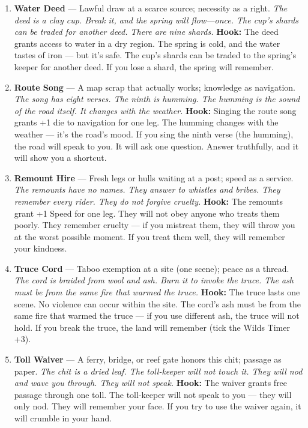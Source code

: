 \begin{enumerate}
\item \textbf{Water Deed} --- Lawful draw at a scarce source; necessity as a right.
  \hfill \textit{The deed is a clay cup. Break it, and the spring will flow---once. The cup's shards can be traded for another deed. There are nine shards.}
  \textbf{Hook:} The deed grants access to water in a dry region. The spring is cold, and the water tastes of iron --- but it's safe. The cup's shards can be traded to the spring's keeper for another deed. If you lose a shard, the spring will remember.
  
\item \textbf{Route Song} --- A map scrap that actually works; knowledge as navigation.
  \hfill \textit{The song has eight verses. The ninth is humming. The humming is the sound of the road itself. It changes with the weather.}
  \textbf{Hook:} Singing the route song grants +1 die to navigation for one leg. The humming changes with the weather --- it's the road's mood. If you sing the ninth verse (the humming), the road will speak to you. It will ask one question. Answer truthfully, and it will show you a shortcut.
  
\item \textbf{Remount Hire} --- Fresh legs or hulls waiting at a post; speed as a service.
  \hfill \textit{The remounts have no names. They answer to whistles and bribes. They remember every rider. They do not forgive cruelty.}
  \textbf{Hook:} The remounts grant +1 Speed for one leg. They will not obey anyone who treats them poorly. They remember cruelty --- if you mistreat them, they will throw you at the worst possible moment. If you treat them well, they will remember your kindness.
  
\item \textbf{Truce Cord} --- Taboo exemption at a site (one scene); peace as a thread.
  \hfill \textit{The cord is braided from wool and ash. Burn it to invoke the truce. The ash must be from the same fire that warmed the truce.}
  \textbf{Hook:} The truce lasts one scene. No violence can occur within the site. The cord's ash must be from the same fire that warmed the truce --- if you use different ash, the truce will not hold. If you break the truce, the land will remember (tick the Wilds Timer +3).
  
\item \textbf{Toll Waiver} --- A ferry, bridge, or reef gate honors this chit; passage as paper.
  \hfill \textit{The chit is a dried leaf. The toll-keeper will not touch it. They will nod and wave you through. They will not speak.}
  \textbf{Hook:} The waiver grants free passage through one toll. The toll-keeper will not speak to you --- they will only nod. They will remember your face. If you try to use the waiver again, it will crumble in your hand.
  

\end{enumerate}
